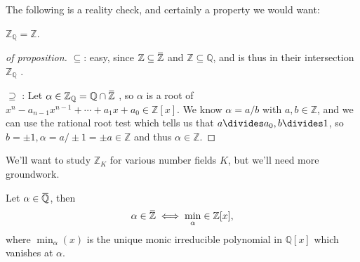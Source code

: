 The following is a reality check, and certainly a property we would
want:

\begin{proposition}

\({\mathbb{Z}}_{\mathbb{Q}}= {\mathbb{Z}}\).

\end{proposition}

\begin{proof}[of proposition]

\(\subseteq\): easy, since
\({\mathbb{Z}}\subseteq \mkern 1.5mu\overline{\mkern-1.5mu{\mathbb{Z}}\mkern-1.5mu}\mkern 1.5mu\)
and \({\mathbb{Z}}\subseteq {\mathbb{Q}}\), and is thus in their
intersection \({\mathbb{Z}}_{\mathbb{Q}}\) .

\(\supseteq\) : Let
\(\alpha\in {\mathbb{Z}}_{\mathbb{Q}}= {\mathbb{Q}}\cap\mkern 1.5mu\overline{\mkern-1.5mu{\mathbb{Z}}\mkern-1.5mu}\mkern 1.5mu\)
, so \(\alpha\) is a root of
\(x^n - a_{n-1}x^{n-1} + \cdots + a_1x + a_0 \in {\mathbb{Z}}[x]\). We
know \(\alpha= a/b\) with \(a,b \in {\mathbb{Z}}\), and we can use the
rational root test which tells us that \(a\divides a_0, b\divides 1\),
so \(b = \pm 1, \alpha = a/\pm 1 = \pm a \in {\mathbb{Z}}\) and thus
\(\alpha \in {\mathbb{Z}}\).

\end{proof}

We'll want to study \({\mathbb{Z}}_K\) for various number fields \(K\),
but we'll need more groundwork.

\begin{proposition}

Let
\(\alpha \in \mkern 1.5mu\overline{\mkern-1.5mu{\mathbb{Q}}\mkern-1.5mu}\mkern 1.5mu\),
then
\begin{align*} \alpha\in \mkern 1.5mu\overline{\mkern-1.5mu{\mathbb{Z}}\mkern-1.5mu}\mkern 1.5mu\iff \min_ \alpha \in {\mathbb{Z}}[x], \end{align*}
where \(\min_ \alpha(x)\) is the unique monic irreducible polynomial in
\({\mathbb{Q}}[x]\) which vanishes at \(\alpha\).

\end{proposition}

